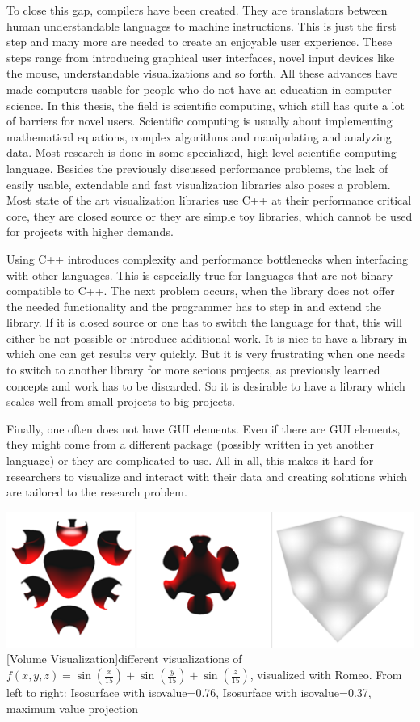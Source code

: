 To close this gap, compilers have been created. They are translators between human understandable languages to machine instructions.
This is just the first step and many more are needed to create an enjoyable user experience.
These steps range from introducing graphical user interfaces, novel input devices like the mouse, understandable visualizations and so forth.
All these advances have made computers usable for people who do not have an education in computer science.
In this thesis, the field is scientific computing, which still has quite a lot of barriers for novel users.
Scientific computing is usually about implementing mathematical equations, complex algorithms and manipulating and analyzing data.
Most research is done in some specialized, high-level scientific computing language.
Besides the previously discussed performance problems, the lack of easily usable, extendable and fast visualization libraries also poses a problem.
Most state of the art visualization libraries use C++ at their performance critical core, they are closed source or they are simple toy libraries, which cannot be used for projects with higher demands.

Using C++ introduces complexity and performance bottlenecks when interfacing with other languages. This is especially true for languages that are not binary compatible to C++. 
The next problem occurs, when the library does not offer the needed functionality and the programmer has to step in and extend the library. If it is closed source or one has to switch the language for that, this will either be not possible or introduce additional work. 
It is nice to have a library in which one can get results very quickly. 
But it is very frustrating when one needs to switch to another library for more serious projects, as previously learned concepts and work has to be discarded.
So it is desirable to have a library which scales well from small projects to big projects.

Finally, one often does not have GUI elements. 
Even if there are GUI elements, they might come from a different package (possibly written in yet another language) or they are complicated to use.
All in all, this makes it hard for researchers to visualize and interact with their data and creating solutions which are tailored to the research problem.

\vspace{1em}
\begin{minipage}{\linewidth}
    \centering
    \includegraphics[width=0.7\linewidth]{graphics/surfaces.png}
    [Volume Visualization]{different visualizations of $f(x,y,z)=\sin(\frac{x}{15})+\sin(\frac{y}{15})+\sin(\frac{z}{15})$, visualized with Romeo. From left to right: Isosurface with isovalue=0.76, Isosurface with isovalue=0.37, maximum value projection}
    \label{fig:volume}
\end{minipage}
\vspace{1em}

